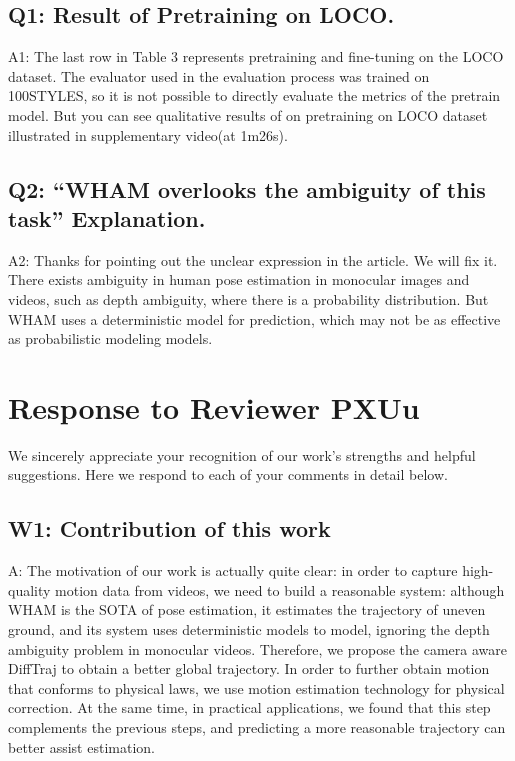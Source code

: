 \documentclass{article}
\begin{document}
\subsection{Q1: Result of Pretraining on LOCO.}\label{q1-result-of-pretraining-on-loco.}

A1: The last row in Table 3 represents pretraining and fine-tuning on the LOCO dataset. The evaluator used in the evaluation process was trained on 100STYLES, so it is not possible to directly evaluate the metrics of the pretrain model. But you can see qualitative results of on pretraining on LOCO dataset illustrated in supplementary video(at 1m26s).

\subsection{Q2: ``WHAM overlooks the ambiguity of this task'' Explanation.}\label{q2-wham-overlooks-the-ambiguity-of-this-task-explanation.}

A2: Thanks for pointing out the unclear expression in the article. We will fix it. There exists ambiguity in human pose estimation in monocular images and videos, such as depth ambiguity, where there is a probability distribution. But WHAM uses a deterministic model for prediction, which may not be as effective as probabilistic modeling models.

\section{Response to Reviewer PXUu}\label{response-to-reviewer-pxuu}

We sincerely appreciate your recognition of our work's strengths and helpful suggestions. Here we respond to each of your comments in detail below.

\subsection{W1: Contribution of this work}\label{w1-contribution-of-this-work}

A: The motivation of our work is actually quite clear: in order to capture high-quality motion data from videos, we need to build a reasonable system: although WHAM is the SOTA of pose estimation, it estimates the trajectory of uneven ground, and its system uses deterministic models to model, ignoring the depth ambiguity problem in monocular videos. Therefore, we propose the camera aware DiffTraj to obtain a better global trajectory. In order to further obtain motion that conforms to physical laws, we use motion estimation technology for physical correction. At the same time, in practical applications, we found that this step complements the previous steps, and predicting a more reasonable trajectory can better assist estimation.
\end{document}
